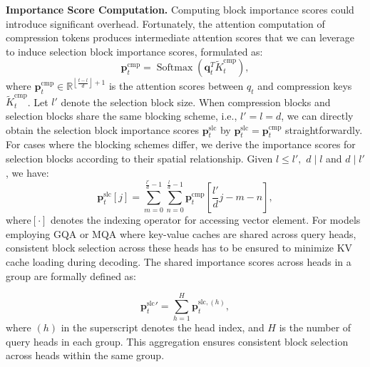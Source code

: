 \textbf{Importance Score Computation.} 
Computing block importance scores could introduce significant overhead. Fortunately, the attention computation of compression tokens produces intermediate attention scores that we can leverage to induce selection block importance scores, formulated as: %
\begin{equation}
\mathbf{p}_t^\text{cmp} = \operatorname{Softmax}\left(\mathbf{q}_t^T \tilde{K}_t^\text{cmp}\right),
\end{equation}
where \( \mathbf{p}_t^\text{cmp} \in \mathbb{R}^{\left\lfloor\frac{t-l}{d}\right\rfloor+1}  \) is the attention scores between $q_t$ and  compression keys $\tilde{K}_t^\text{cmp}$. 
Let $l'$ denote the selection block size. 
When compression blocks and selection blocks share the same blocking scheme, i.e., $l'=l=d$,
we can directly obtain the selection block importance scores $\mathbf{p}_t^\text{slc}$ by $\mathbf{p}_t^\text{slc} = \mathbf{p}_t^\text{cmp}$ straightforwardly.
For cases where the blocking schemes differ, we derive the importance scores for selection blocks according to their spatial relationship. Given $l\leq l', $ $d \mid l$ and $d \mid l'$, we have:
\begin{equation}
\mathbf{p}_t^\text{slc}[j] = \sum_{m=0}^{\frac{l'}{d}-1}\sum_{n=0}^{\frac{l}{d} -1} \mathbf{p}_t^\text{cmp}\left[\frac{l'}{d}j -m -n \right],
\label{equ.8}
\end{equation}
where$[\cdot]$ denotes the indexing operator for accessing vector element. 
For models employing GQA or MQA where key-value caches are shared across query heads, consistent block selection across these heads has to be ensured to minimize KV cache loading during decoding. The shared importance scores across heads in a group are formally defined as:

\begin{equation}
{\mathbf{p}_t^{\text{slc}}}' = \sum_{h=1}^{H} \mathbf{p}_{t}^{\text{slc}, (h)},
\end{equation}
where $(h)$ in the superscript denotes the head index, and $H$ is the number of query heads in each group. This aggregation ensures consistent block selection across heads within the same group.

